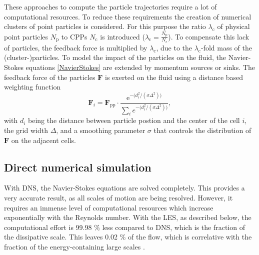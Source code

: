 \documentclass[11pt,a4paper,openany,oneside,parskip=half*]{article}
\renewcommand*\vec[1]{\boldsymbol{#1}}
\begin{document}
\newline
These approaches to compute the particle trajectories require a lot of computational resources. 
\newline
To reduce these requirements the creation of numerical clusters of point particles is considered. For this purpose the ratio $\lambda_\mathrm{c}$ of physical point particles $N_\mathrm{p}$ to CPPs $N_\mathrm{c}$ is introduced ($\lambda_\mathrm{c} = \frac{N_\mathrm{p}}{N_\mathrm{c}}$). To compensate this lack of particles, the feedback force is multiplied by $\lambda_\mathrm{c}$, due to the $\lambda_\mathrm{c}$-fold mass of the (cluster-)particles.
\newline
To model the impact of the particles on the fluid, the Navier-Stokes equations \eqref{NavierStokes} are extended by momentum sources or sinks. The feedback force of the particles $\vec{F}$ is exerted on the fluid using a distance based weighting function
\begin{equation}
\vec{F}_i = \vec{F}_\mathrm{pp} \cdot \frac{\mathrm{e}^{- \big(d_i^\mathrm{2}/(\sigma \Delta^\mathrm{2})\big)}}{\sum \limits_{i} e^{- \big(d_i^\mathrm{2}/(\sigma \Delta^\mathrm{2}) \big)}},
\end{equation}
with $d_i$ being the distance between particle postion and the center of the cell $i$, the grid width $\Delta$, and a smoothing parameter $\sigma$ that controls the distribution of $\vec{F}$ on the adjacent cells.
\newline
\subsection{Direct numerical simulation}
With DNS, the Navier-Stokes equations are solved completely. This provides a very accurate result, as all scales of motion are being resolved. However, it requires an immense level of computational resources which increase exponentially with the Reynolds number. With the LES, as described below, the computational effort is 99.98 \% less compared to DNS, which is the fraction of the dissipative scale. This leaves 0.02 \% of the flow, which is correlative with the fraction of the energy-containing large scales \cite{turbulentFlows}.
\newline
\end{document}
